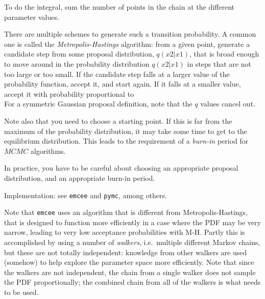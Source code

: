 \documentclass[12pt]{article}
\begin{document}
To do the integral, sum the number of points in the chain at the
different parameter values.

There are multiple schemes to generate such a transition probability.
A common one is called the \emph{Metropolis-Hastings} algorithm:
from a given point, generate a candidate step from some proposal
distribution, $q(x2|x1)$, that is broad enough to move around in the
probability distribution $q(x2|x1)$ in steps that are not too large
or too small. If the candidate step falls at a larger value of the
probability function, accept it, and start again. If it falls at a
smaller value, accept it with probability proportional to
$$ $$
For a symmetric Gaussian proposal definition, note that the $q$ values
cancel out.

Note also that you need to choose a starting point. If this is far from
the maximum of the probability distribution, it may take some time to
get to the equilibrium distribution. This leads to the requirement of a
\emph{burn-in} period for $MCMC$ algorithms.

In practice, you have to be careful about choosing an appropriate
proposal distribution, and an appropriate burn-in period.

Implementation: see \texttt{emcee} and \texttt{pymc}, among others.

Note that \texttt{emcee} uses an algorithm that is different from
Metropolis-Hastings, that is designed to function more efficiently
in a case where the PDF may be very narrow, leading to very low
acceptance probabilities with M-H. Partly this is accomplished by
using a number of \emph{walkers}, i.e.\ multiple different Markov
chains, but these are not totally independent: knowledge from other
walkers are used (somehow) to help explore the parameter space more
efficiently. Note that since the walkers are not independent, the
chain from a single walker does not sample the PDF proportionally;
the combined chain from all of the walkers is what needs to be used.
\end{document}
